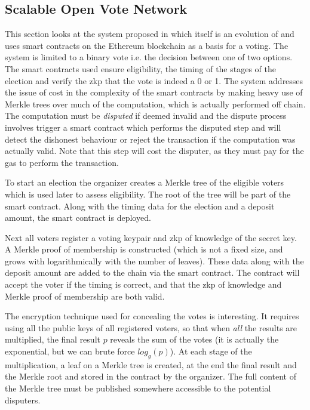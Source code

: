 \subsection{Scalable Open Vote Network}

This section looks at the system proposed in \cite{seifelnasrScalableOpenVoteNetwork2020} which itself is an evolution of \cite{mccorrySmartContractBoardroom2017} and uses smart contracts on the Ethereum blockchain as a basis for a voting. The system is limited to a binary vote i.e. the decision between one of two options. The smart contracts used ensure eligibility, the timing of the stages of the election and verify the \gls{zkp} that the vote is indeed a 0 or 1. The system addresses the issue of cost in the complexity of the smart contracts by making heavy use of Merkle trees over much of the computation, which is actually performed off chain. The computation must be \emph{disputed} if deemed invalid and the dispute process involves trigger a smart contract which performs the disputed step and will detect the dishonest behaviour or reject the transaction if the computation was actually valid. Note that this step will cost the disputer, as they must pay for the gas to perform the transaction.

To start an election the organizer creates a Merkle tree of the eligible voters which is used later to assess eligibility. The root of the tree will be part of the smart contract. Along with the timing data for the election and a deposit amount, the smart contract is deployed.

Next all voters register a voting keypair and \gls{zkp} of knowledge of the secret key. A Merkle proof of membership is constructed (which is not a fixed size, and grows with logarithmically with the number of leaves). These data along with the deposit amount are added to the chain via the smart contract. The contract will accept the voter if the timing is correct, and that the \gls{zkp} of knowledge and Merkle proof of membership are both valid.

The encryption technique used for concealing the votes is interesting. It requires using all the public keys of all registered voters, so that when \emph{all} the results are multiplied, the final result $p$ reveals the sum of the votes (it is actually the exponential, but we can brute force $log_g(p)$). At each stage of the multiplication, a leaf on a Merkle tree is created, at the end the final result and the Merkle root and stored in the contract by the organizer. The full content of the Merkle tree must be published somewhere accessible to the potential disputers.

